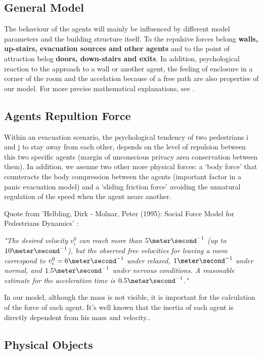 \documentclass[11pt]{article}
\begin{document}


\subsection{General Model}

The behaviour of the agents will mainly be influenced by different model
parameters and the building structure itself. To the repulsive forces belong
\textbf{walls, up-stairs, evacuation sources and other agents} and to the point
of attraction belog \textbf{doors, down-stairs and exits}. In
addition, psychological reaction to the approach to a wall or another agent, the
feeling of enclosure in a corner of the room and the accelation because of a
free path are also properties of our model. For more precise mathematical
explanations, see \cite{SFMPD}.

\subsection*{Agents Repultion Force}

Within an evacuation scenario, the psychological tendency of two pedestrians i
and j to stay away from each other, depends on the level of repulsion between
this two specific agents (margin of unconscious privacy area conservation
between them). In addition, we assume two other more physical forces: a `body
force' that counteracts the body compression between the agents (important
factor in a panic evacuation model) and a `sliding friction force' avoiding the
unnatural regulation of the speed when the agent nears another. \cite{SFMPD} 

Quote from 'Helbling, Dirk - Molnar, Peter (1995): Social Force Model for Pedestrians Dynamics' \cite{SFMPD} :
\begin{center}
\textit{"The desired velocity $v^0_i$ can reach more than $5 \meter\second^{-1}$ (up to $10 \meter\second^{-1}$), but the observed free velocities	for	leaving	a	room	correspond	to	$v^0_i=6 \meter\second^{-1}$ under relaxed, $1\meter\second^{-1}$ under normal, and $1.5\meter\second^{-1}$ under nervous conditions. A reasonable estimate for the acceleration time is $0.5\meter\second^{-1}$."}
\end{center}
In our model, although the mass is not visible, it is important for
the calculation of the force of each agent. It's well known that the inertia of
each agent is directly dependent from his mass and velocity..


\subsection*{Physical Objects}
\end{document}
